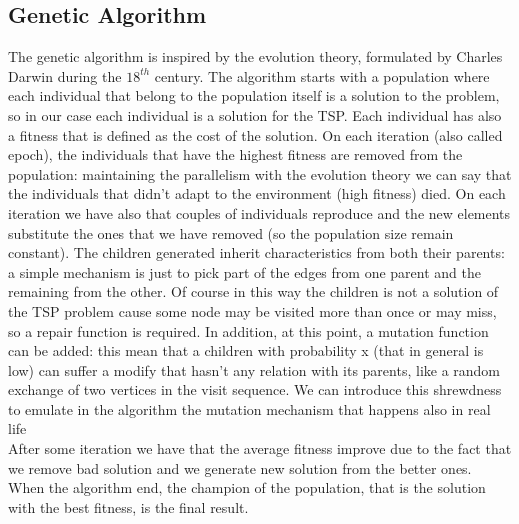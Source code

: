 \subsection{Genetic Algorithm}
The genetic algorithm is inspired by the evolution theory, formulated by Charles Darwin during the $18^{th}$ century. 
The algorithm starts with a population where each individual that belong to the population itself is a solution to the problem, so in our case each individual is a solution for the TSP. Each individual has also a fitness that is defined as the cost of the solution. On each iteration (also called epoch), the individuals that have the highest fitness are removed from the population: maintaining the parallelism with the evolution theory we can say that the individuals that didn't adapt to the environment (high fitness) died.
On each iteration we have also that couples of individuals reproduce and the new elements substitute the ones that we have removed (so the population size remain constant). The children generated inherit characteristics from both their parents: a simple mechanism is just to pick part of the edges from one parent and the remaining from the other. Of course in this way the children is not a solution of the TSP problem cause some node may be visited more than once or may miss, so a repair function is required. In addition, at this point, a mutation function can be added: this mean that a children with probability x (that in general is low) can suffer a modify that hasn't any relation with its parents, like a random exchange of two vertices in the visit sequence. We can introduce this shrewdness to emulate in the algorithm the mutation mechanism that happens also in real life\\
After some iteration we have that the average fitness improve due to the fact that we remove bad solution and we generate new solution from the better ones. When the algorithm end, the champion of the population, that is the solution with the best fitness, is the final result. \\



